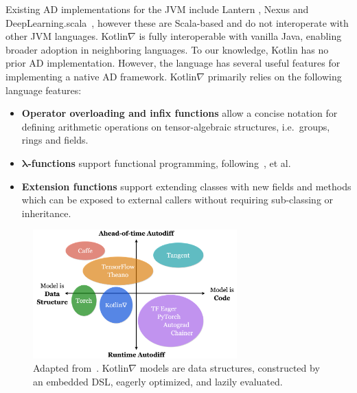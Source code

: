 \documentclass[12pt,initial,twoside,maitrise]{dms}
\numberwithin{equation}{section}
\numberwithin{table}{chapter}
\numberwithin{figure}{chapter}
\begin{document}
Existing AD implementations for the JVM include Lantern \citep{wang2018demystifying}, Nexus \citep{chen2017typesafe} and DeepLearning.scala~\citep{dl4s}, however these are Scala-based and do not interoperate with other JVM languages. Kotlin$\nabla$ is fully interoperable with vanilla Java, enabling broader adoption in neighboring languages. To our knowledge, Kotlin has no prior AD implementation. However, the language has several useful features for implementing a native AD framework. Kotlin$\nabla$ primarily relies on the following language features:

\begin{itemize}
\item \textbf{Operator overloading and infix functions} allow a concise notation for defining arithmetic operations on tensor-algebraic structures, i.e.\ groups, rings and fields.
\item \textbf{$\mathbf{\lambda}$-functions} support functional programming, following~\citet{pearlmutter2008reverse, pearlmutter2008using, siskind2008nesting, elliott2009beautiful, elliott2018simple}, et al.
\item \textbf{Extension functions} support extending classes with new fields and methods which can be exposed to external callers without requiring sub-classing or inheritance.
\end{itemize}

\begin{figure}
    \centering
    \includegraphics[width=0.70\textwidth]{kotlingrad_diagram.png}
    \caption{Adapted from~\citet{van2018tangent}. Kotlin$\nabla$ models are data structures, constructed by an embedded DSL, eagerly optimized, and lazily evaluated.}
    \label{fig:kotlingrad_digram}
\end{figure}
\end{document}
